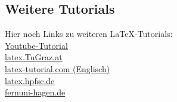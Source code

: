 \subsection{Weitere Tutorials}
Hier noch Links zu weiteren \LaTeX -Tutorials: \\
{\color{blue}
\href{https://www.youtube.com/watch?v=hRwUjJYeHjw}{Youtube-Tutorial} \\
\href{https://latex.tugraz.at/latex/tutorial}{latex.TuGraz.at}\\
\href{https://www.latex-tutorial.com/tutorials/}{latex-tutorial.com {\color{black}(Englisch)}}\\
\href{http://latex.hpfsc.de/content/latex_tutorial/}{latex.hpfsc.de}\\
\href{https://www.fernuni-hagen.de/imperia/md/content/zmi_2010/a026_latex_einf.pdf}{fernuni-hagen.de}}\\

	


